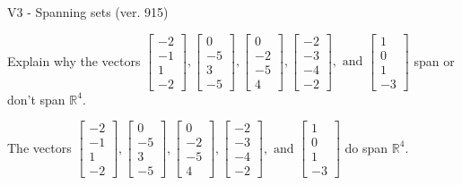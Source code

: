 \begin{exercise}
  \begin{exerciseTitle}V3 - Spanning sets (ver. 915)\end{exerciseTitle}
  \begin{exerciseStatement}
    Explain why the vectors \(\left[\begin{array}{r}
-2 \\
-1 \\
1 \\
-2
\end{array}\right] , \left[\begin{array}{r}
0 \\
-5 \\
3 \\
-5
\end{array}\right] , \left[\begin{array}{r}
0 \\
-2 \\
-5 \\
4
\end{array}\right] , \left[\begin{array}{r}
-2 \\
-3 \\
-4 \\
-2
\end{array}\right] , \text{ and } \left[\begin{array}{r}
1 \\
0 \\
1 \\
-3
\end{array}\right]\) span or don't span \(\mathbb{R}^4\). 
	


  \end{exerciseStatement}
  \begin{exerciseAnswer}
   The vectors \(\left[\begin{array}{r}
-2 \\
-1 \\
1 \\
-2
\end{array}\right] , \left[\begin{array}{r}
0 \\
-5 \\
3 \\
-5
\end{array}\right] , \left[\begin{array}{r}
0 \\
-2 \\
-5 \\
4
\end{array}\right] , \left[\begin{array}{r}
-2 \\
-3 \\
-4 \\
-2
\end{array}\right] , \text{ and } \left[\begin{array}{r}
1 \\
0 \\
1 \\
-3
\end{array}\right]\) 
  	 do  
	span \(\mathbb{R}^4\).
  



\end{exerciseAnswer}
\end{exercise}
